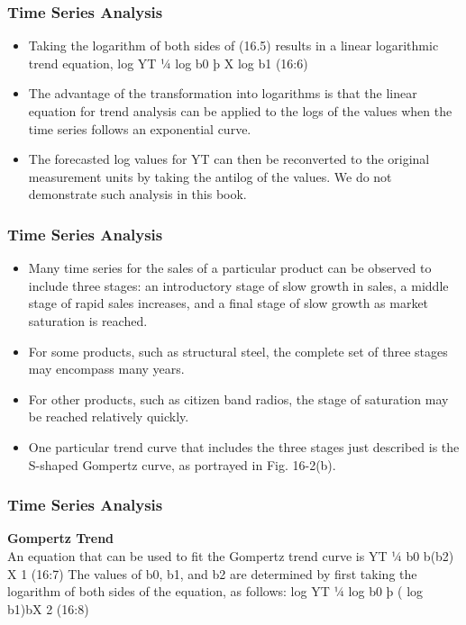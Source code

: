 \documentclass{beamer}
\begin{document}
\begin{frame}
\frametitle{Time Series Analysis}
\begin{itemize}
\item Taking the logarithm of both sides of (16.5) results in a linear logarithmic trend equation,
log YT ¼ log b0 þ X log b1 (16:6)
\item The advantage of the transformation into logarithms is that the linear equation for trend analysis can be
applied to the logs of the values when the time series follows an exponential curve.
\item  The forecasted log values
for YT can then be reconverted to the original measurement units by taking the antilog of the values. We do not
demonstrate such analysis in this book.
\end{itemize}
\end{frame}
\begin{frame}
\frametitle{Time Series Analysis}
\begin{itemize}
\item Many time series for the sales of a particular product can be observed to include three stages: an
introductory stage of slow growth in sales, a middle stage of rapid sales increases, and a final stage of slow
growth as market saturation is reached.
\item For some products, such as structural steel, the complete set of three
stages may encompass many years. 
\item For other products, such as citizen band radios, the stage of saturation may
be reached relatively quickly. 
\item One particular trend curve that includes the three stages just described is the
S-shaped Gompertz curve, as portrayed in Fig. 16-2(b). 
\end{itemize}
\end{frame}
\begin{frame}
\frametitle{Time Series Analysis}
\textbf{Gompertz Trend}\\
An equation that can be used to fit the Gompertz trend
curve is
YT ¼ b0 b(b2) X
1 (16:7)
The values of b0, b1, and b2 are determined by first taking the logarithm of both sides of the equation, as
follows:
log YT ¼ log b0 þ ( log b1)bX
2 (16:8)

\end{frame}
\end{document}
